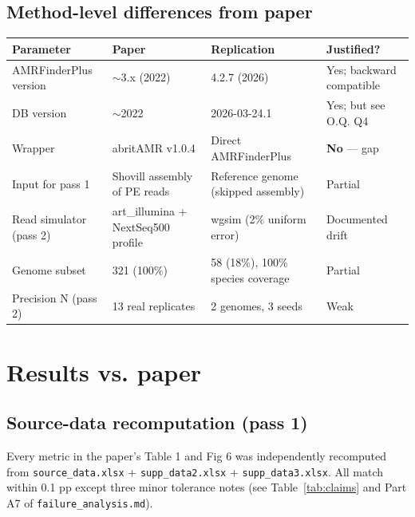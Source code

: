 \documentclass[11pt,a4paper]{article}
\begin{document}
\subsection{Method-level differences from paper}

\begin{tabular}{@{}p{4cm} p{4.5cm} p{4.5cm} p{2cm}@{}}
\toprule
\textbf{Parameter} & \textbf{Paper} & \textbf{Replication} & \textbf{Justified?} \\
\midrule
AMRFinderPlus version & $\sim$3.x (2022) & 4.2.7 (2026) & Yes; backward compatible \\
DB version & $\sim$2022 & 2026-03-24.1 & Yes; but see O.Q. Q4 \\
Wrapper & abritAMR v1.0.4 & Direct AMRFinderPlus & \textbf{No} --- gap \\
Input for pass 1 & Shovill assembly of PE reads & Reference genome (skipped assembly) & Partial \\
Read simulator (pass 2) & art\_illumina + NextSeq500 profile & wgsim (2\% uniform error) & Documented drift \\
Genome subset & 321 (100\%) & 58 (18\%), 100\% species coverage & Partial \\
Precision N (pass 2) & 13 real replicates & 2 genomes, 3 seeds & Weak \\
\bottomrule
\end{tabular}

\section{Results vs. paper}

\subsection{Source-data recomputation (pass 1)}
Every metric in the paper's Table 1 and Fig 6 was independently recomputed from \texttt{source\_data.xlsx} + \texttt{supp\_data2.xlsx} + \texttt{supp\_data3.xlsx}. All match within 0.1 pp except three minor tolerance notes (see Table~\ref{tab:claims} and Part A7 of \texttt{failure\_analysis.md}).
\end{document}
